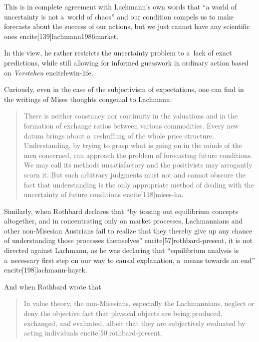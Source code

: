 {This is in complete agreement with Lachmann's own words that ``a world of uncertainty is not a~world of chaos'' and our condition compels us to make forecasts about the success of our actions, but we just cannot have any scientific ones encite[139]{lachmann1986market}.

In this view, he rather restricts the uncertainty problem to a~lack of exact predictions, while still allowing for informed guesswork in ordinary action based on \emph{Verstehen} encite{lewin-life}.

Curiously, even in the case of the subjectivism of expectations, one can find in the writings of Mises thoughts congenial to Lachmann:

\begin{quote}

There is neither constancy nor continuity in the valuations and in the formation of exchange ratios between various commodities. Every new datum brings about a~reshuffling of the whole price structure. Understanding, by trying to grasp what is going on in the minds of the men concerned, can approach the problem of forecasting future conditions. We may call its methods unsatisfactory and the positivists may arrogantly scorn it. But such arbitrary judgments must not and cannot obscure the fact that understanding is the only appropriate method of dealing with the uncertainty of future conditions encite[118]{mises-ha}.

\end{quote}



Similarly, when Rothbard declares that ``by tossing out equilibrium concepts altogether, and in concentrating only on market processes, Lachmannians and other non-Misesian Austrians fail to realize that they thereby give up any chance of understanding those processes themselves'' encite[57]{rothbard-present}, it is not directed against Lachmann, as he was declaring that ``equilibrium analysis is a~necessary first step on our way to causal explanation, a~means towards an end'' encite[198]{lachmann-hayek}.



And when Rothbard wrote that

\begin{quote}

In value theory, the non-Misesians, especially the Lachmannians, neglect or deny the objective fact that physical objects are being produced, exchanged, and evaluated, albeit that they are subjectively evaluated by acting individuals encite[50]{rothbard-present},


\end{quote}}
